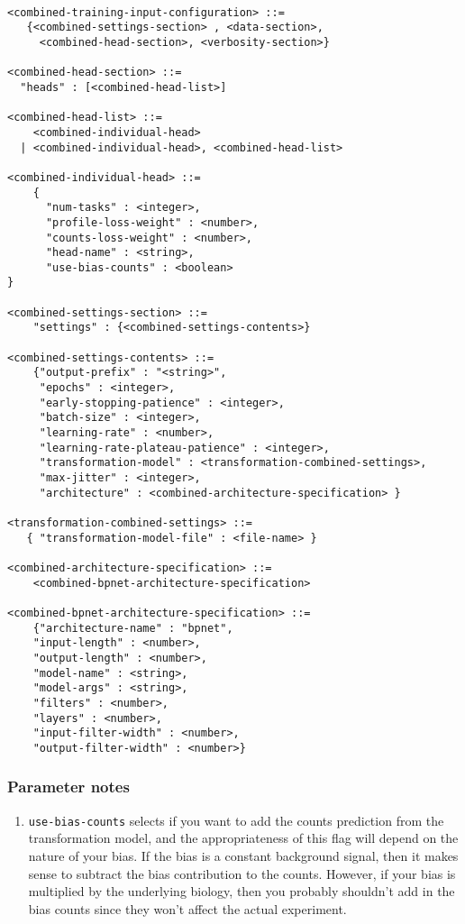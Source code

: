\documentclass{article}
\begin{document}
\begin{lstlisting}

<combined-training-input-configuration> ::= 
   {<combined-settings-section> , <data-section>, 
     <combined-head-section>, <verbosity-section>}

<combined-head-section> ::= 
  "heads" : [<combined-head-list>]

<combined-head-list> ::= 
    <combined-individual-head>
  | <combined-individual-head>, <combined-head-list>

<combined-individual-head> ::=
    {
      "num-tasks" : <integer>,
      "profile-loss-weight" : <number>,
      "counts-loss-weight" : <number>,
      "head-name" : <string>,
      "use-bias-counts" : <boolean>
}

<combined-settings-section> ::= 
    "settings" : {<combined-settings-contents>}

<combined-settings-contents> ::= 
    {"output-prefix" : "<string>",
     "epochs" : <integer>, 
     "early-stopping-patience" : <integer>, 
     "batch-size" : <integer>, 
     "learning-rate" : <number>, 
     "learning-rate-plateau-patience" : <integer>,
     "transformation-model" : <transformation-combined-settings>,
     "max-jitter" : <integer>,
     "architecture" : <combined-architecture-specification> } 

<transformation-combined-settings> ::= 
   { "transformation-model-file" : <file-name> }

<combined-architecture-specification> ::= 
    <combined-bpnet-architecture-specification>

<combined-bpnet-architecture-specification> ::= 
    {"architecture-name" : "bpnet",
    "input-length" : <number>, 
    "output-length" : <number>,
    "model-name" : <string>,
    "model-args" : <string>,
    "filters" : <number>,
    "layers" : <number>,
    "input-filter-width" : <number>,
    "output-filter-width" : <number>}
\end{lstlisting}

\subsubsection{Parameter notes}

\begin{enumerate}
    \item \texttt{use-bias-counts} selects if you want to add the counts prediction from the transformation model, and the appropriateness of this flag will depend on the nature of your bias. If the bias is a constant background signal, then it makes sense to subtract the bias contribution to the counts. However, if your bias is multiplied by the underlying biology, then you probably shouldn't add in the bias counts since they won't affect the actual experiment. 
\end{enumerate}
\end{document}
